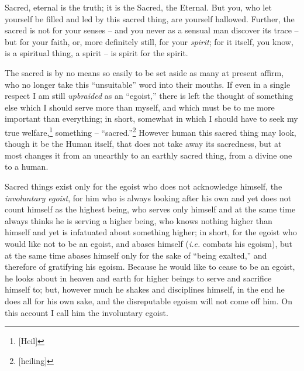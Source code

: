 \documentclass[12pt,a4paper]{book}
\begin{document}
Sacred, eternal is the truth; it is the Sacred, the Eternal. But you, who let 
yourself be filled and led by this sacred thing, are yourself hallowed. 
Further, the sacred is not for your senses -- and you never as a sensual man 
discover its trace -- but for your faith, or, more definitely still, for your 
\textit{spirit}; for it itself, you know, is a spiritual thing, a spirit -- is 
spirit for the spirit.

The sacred is by no means so easily to be set aside as many at present affirm, 
who no longer take this ``unsuitable'' word into their mouths. If even in a 
single respect I am still \textit{upbraided} as an ``egoist,'' there is left 
the thought of something else which I should serve more than myself, and which 
must be to me more important than everything; in short, somewhat in which I 
should have to seek my true welfare,\footnote{[Heil]} something -- 
``sacred.''\footnote{[heiling]} However human this sacred thing may look, 
though it be the Human itself, that does not take away its sacredness, but at 
most changes it from an unearthly to an earthly sacred thing, from a divine 
one to a human.

Sacred things exist only for the egoist who does not acknowledge himself, the 
\textit{involuntary egoist}, for him who is always looking after his own and 
yet does not count himself as the highest being, who serves only himself and 
at the same time always thinks he is serving a higher being, who knows nothing 
higher than himself and yet is infatuated about something higher; in short, 
for the egoist who would like not to be an egoist, and abases himself 
(\textit{i.e.} combats his egoism), but at the same time abases himself only 
for the sake of ``being exalted,'' and therefore of gratifying his egoism. 
Because he would like to cease to be an egoist, he looks about in heaven and 
earth for higher beings to serve and sacrifice himself to; but, however much 
he shakes and disciplines himself, in the end he does all for his own sake, 
and the disreputable egoism will not come off him. On this account I call him 
the involuntary egoist.
\end{document}
